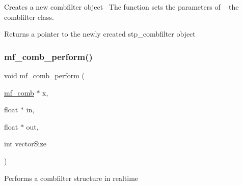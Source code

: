 Creates a new combfilter object~\newline
 The function sets the parameters of ~\newline
 the combfilter class. 

\begin{DoxyReturn}{Returns}
a pointer to the newly created stp\+\_\+combfilter object ~\newline
 
\end{DoxyReturn}
\mbox{\label{structmf__comb_aef76b189b3bbef38d1ef4d3e1e4a8fdf}} 
\subsubsection{\texorpdfstring{mf\+\_\+comb\+\_\+perform()}{mf\_comb\_perform()}}
{\footnotesize\ttfamily void mf\+\_\+comb\+\_\+perform (\begin{DoxyParamCaption}\item[{\mbox{\hyperlink{structmf__comb}{mf\+\_\+comb}} $\ast$}]{x,  }\item[{float $\ast$}]{in,  }\item[{float $\ast$}]{out,  }\item[{int}]{vector\+Size }\end{DoxyParamCaption})\hspace{0.3cm}{\ttfamily [related]}}



Performs a combfilter structure in realtime ~\newline
 


